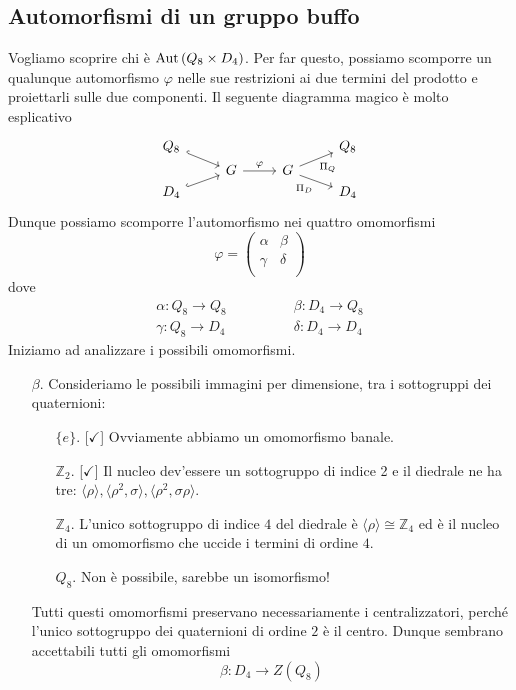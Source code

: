 \subsection{Automorfismi di un gruppo buffo}
\begin{multicols}{2}
	Vogliamo scoprire chi è $ \mathrm{Aut}\left( Q_8 \times D_4 \right) $. Per far questo, possiamo scomporre un qualunque automorfismo $ \varphi $ nelle sue restrizioni ai due termini del prodotto e proiettarli sulle due componenti. Il seguente diagramma magico è molto esplicativo
	\[ \begin{tikzcd}[row sep = 0.05 cm]
	Q_8 \arrow[swap, hook]{dr}{} & & & Q_8 \\
	 & G \arrow{r}{\varphi} & G \arrow[swap]{ur}{\Pi_Q}\arrow[swap]{dr}{\Pi_D} & \\
	D_4 \arrow[swap, hook]{ur}{} &  &  & D_4
	\end{tikzcd}\]
	Dunque possiamo scomporre l'automorfismo nei quattro omomorfismi
	\[ \varphi= \left(\begin{matrix}
	\alpha & \beta \\
	\gamma & \delta \\
	\end{matrix}\right) \]
	dove 
	\begin{align*}
		\alpha: Q_8 \rightarrow Q_8 \qquad & \qquad \beta: D_4 \rightarrow Q_8 \\
		\gamma: Q_8 \rightarrow D_4 \qquad & \qquad \delta: D_4 \rightarrow D_4
	\end{align*}
	 Iniziamo ad analizzare i possibili omomorfismi.
	 \begin{itemize}
	 	\item [$ \beta $.] Consideriamo le possibili immagini per dimensione, tra i sottogruppi dei quaternioni:
	 	\begin{itemize}
	 		\item [$\{e\}  $.][$ \checkmark $] Ovviamente abbiamo un omomorfismo banale.
	 		\item [$ \mathbb{Z}_2 $.][$ \checkmark $] Il nucleo dev'essere un sottogruppo di indice 2 e il diedrale ne ha tre: $ \langle \rho \rangle, \langle \rho^2, \sigma \rangle, \langle \rho^2, \sigma\rho \rangle $.
	 		\item [$ \mathbb{Z}_4 $.] L'unico sottogruppo di indice $ 4 $ del diedrale è $ \langle \rho \rangle \cong \mathbb{Z}_4 $ ed è il nucleo di un omomorfismo che uccide i termini di ordine $ 4 $.
	 		\item [$ Q_8 $.] Non è possibile, sarebbe un isomorfismo!
	 	\end{itemize}
	 	Tutti questi omomorfismi preservano necessariamente i centralizzatori, perché l'unico sottogruppo dei quaternioni di ordine $ 2 $ è il centro. Dunque sembrano accettabili tutti gli omomorfismi
	 	\[ \boxed{\beta: D_4 \to Z(Q_8)} \]
	 	

\end{itemize}
\end{multicols}
